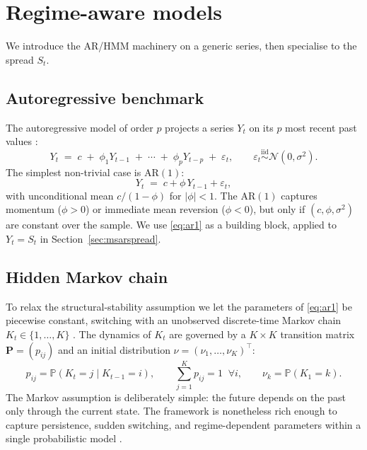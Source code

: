 
\section{Regime-aware models}\label{sec:regimemodels}

We introduce the AR/HMM machinery on a generic series, then specialise to the spread $S_t$.

\subsection{Autoregressive benchmark}\label{sec:ar}

The autoregressive model of order $p$ projects a series $Y_t$ on its $p$ most recent past values \parencite{hamilton1994,tsay2010}:
\begin{equation}\label{eq:arp}
    Y_t \;=\; c \;+\; \phi_{1} Y_{t-1} \;+\; \cdots \;+\; \phi_{p} Y_{t-p} \;+\; \varepsilon_t, \qquad \varepsilon_t \overset{\mathrm{iid}}{\sim} \mathcal{N}(0,\sigma^{2}).
\end{equation}
The simplest non-trivial case is $\mathrm{AR}(1)$:
\begin{equation}\label{eq:ar1}
    Y_t \;=\; c + \phi\, Y_{t-1} + \varepsilon_t,
\end{equation}
with unconditional mean $c/(1-\phi)$ for $|\phi|<1$. The $\mathrm{AR}(1)$ captures momentum ($\phi > 0$) or immediate mean reversion ($\phi < 0$), but only if $(c,\phi,\sigma^{2})$ are constant over the sample. We use \eqref{eq:ar1} as a building block, applied to $Y_t = S_t$ in Section~\ref{sec:msarspread}.

\subsection{Hidden Markov chain}\label{sec:hmm}

To relax the structural-stability assumption we let the parameters of \eqref{eq:ar1} be piecewise constant, switching with an unobserved discrete-time Markov chain $K_t \in \{1,\ldots,K\}$ \parencite{hamilton1989new,rabiner1989tutorial,krolzig1997msvar,cappe2005}. The dynamics of $K_t$ are governed by a $K \times K$ transition matrix $\mathbf{P} = (p_{ij})$ and an initial distribution $\nu = (\nu_1,\ldots,\nu_K)^{\top}$:
\begin{equation}\label{eq:transitionmatrix}
    p_{ij} = \mathbb{P}(K_t = j \mid K_{t-1} = i),
    \qquad
    \sum_{j=1}^{K} p_{ij} = 1 \;\;\forall i,
    \qquad
    \nu_k = \mathbb{P}(K_1 = k).
\end{equation}
The Markov assumption is deliberately simple: the future depends on the past only through the current state. The framework is nonetheless rich enough to capture persistence, sudden switching, and regime-dependent parameters within a single probabilistic model \parencite{rabiner1989tutorial}.

